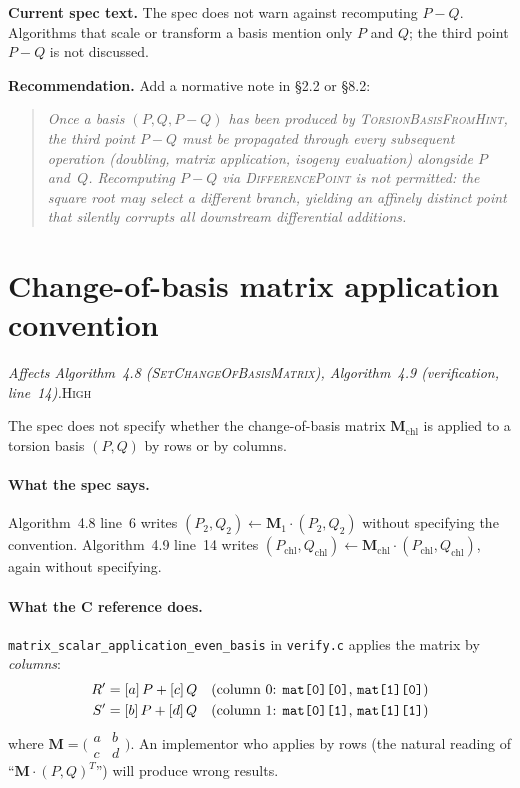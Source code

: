 \documentclass[a4paper,11pt]{article}
\newcommand{\algo}[1]{Algorithm~#1}
\newcommand{\high}{\textsc{\color{BurntOrange}High}}
\newcommand{\finding}[2]{\noindent\textit{#1}\hfill#2\par\smallskip}
\begin{document}
\textbf{Current spec text.} The spec does not warn against recomputing
$P{-}Q$.  Algorithms that scale or transform a basis mention only $P$
and $Q$; the third point $P{-}Q$ is not discussed.

\medskip\noindent\textbf{Recommendation.}  Add a normative note in \S2.2 or \S8.2:
\begin{quote}
  \itshape Once a basis $(P, Q, P{-}Q)$ has been produced by
  \textsc{TorsionBasisFromHint}, the third point $P{-}Q$ must be
  propagated through every subsequent operation (doubling, matrix
  application, isogeny evaluation) alongside $P$ and~$Q$.
  Recomputing $P{-}Q$ via \textsc{DifferencePoint} is not permitted:
  the square root may select a different branch, yielding an affinely
  distinct point that silently corrupts all downstream differential
  additions.
\end{quote}

\section{Change-of-basis matrix application convention}

\finding{Affects \algo{4.8} (\textsc{SetChangeOfBasisMatrix}),
  \algo{4.9} (verification, line~14).}{\high}

The spec does not specify whether the change-of-basis matrix
$\mathbf{M}_\mathrm{chl}$ is applied to a torsion basis $(P, Q)$
by rows or by columns.

\paragraph{What the spec says.}
\algo{4.8} line~6 writes $(P_2, Q_2) \leftarrow \mathbf{M}_1 \cdot (P_2, Q_2)$
without specifying the convention.
\algo{4.9} line~14 writes
$(P_\mathrm{chl}, Q_\mathrm{chl}) \leftarrow \mathbf{M}_\mathrm{chl} \cdot (P_\mathrm{chl}, Q_\mathrm{chl})$,
again without specifying.

\paragraph{What the C reference does.}
\texttt{matrix\_scalar\_application\_even\_basis} in \texttt{verify.c}
applies the matrix by \emph{columns}:
\begin{align*}
  R' &= [a]\,P + [c]\,Q  &&\text{(column 0: \texttt{mat[0][0]}, \texttt{mat[1][0]})} \\
  S' &= [b]\,P + [d]\,Q  &&\text{(column 1: \texttt{mat[0][1]}, \texttt{mat[1][1]})}
\end{align*}
where $\mathbf{M} = \bigl(\begin{smallmatrix} a & b \\ c & d \end{smallmatrix}\bigr)$.
An implementor who applies by rows (the natural reading of
``$\mathbf{M} \cdot (P, Q)^T$'') will produce wrong results.
\end{document}
